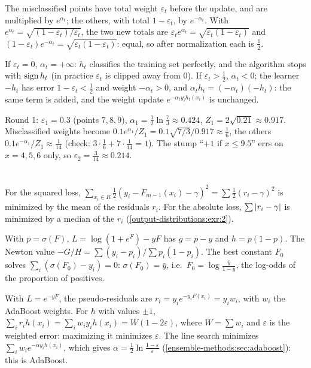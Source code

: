 The misclassified points have total weight $\varepsilon_t$ before the update, and are multiplied by $e^{\alpha_t}$; the
others, with total $1 - \varepsilon_t$, by $e^{-\alpha_t}$. With $e^{\alpha_t} = \sqrt{(1 - \varepsilon_t)/\varepsilon_t}$, the two new totals are
$\varepsilon_te^{\alpha_t} = \sqrt{\varepsilon_t(1 - \varepsilon_t)}$ and $(1 - \varepsilon_t)e^{-\alpha_t} = \sqrt{\varepsilon_t(1 - \varepsilon_t)}$: equal, so after normalization each is $\frac12$.

If $\varepsilon_t = 0$, $\alpha_t = +\infty$: $h_t$ classifies the training set perfectly, and the algorithm stops with
$\operatorname{sign} h_t$ (in practice $\varepsilon_t$ is clipped away from $0$). If $\varepsilon_t>\frac12$, $\alpha_t<0$; the learner $-h_t$ has error $1 - \varepsilon_t<\frac12$
and weight $-\alpha_t>0$, and $\alpha_th_t = (-\alpha_t)(-h_t)$: the same term is added, and the weight update
$e^{-\alpha_ty_ih_t(x_i)}$ is unchanged.

Round 1: $\varepsilon_1 = 0.3$ (points $7, 8, 9$), $\alpha_1 = \frac12\ln\frac73\approx0.424$, $Z_1 = 2\sqrt{0.21}\approx0.917$. Misclassified weights become
$0.1e^{\alpha_1}/Z_1 = 0.1\sqrt{7/3}/0.917\approx\frac16$, the others $0.1e^{-\alpha_1}/Z_1\approx\frac1{14}$ (check: $3\cdot\frac16 + 7\cdot\frac1{14} = 1$). The stump
``$+1$ if $x\leq9.5$'' errs on $x = 4, 5, 6$ only, so $\varepsilon_2 = \frac3{14}\approx0.214$.

\section{}

For the squared loss, $\sum_{x_i\in R}\frac12(y_i - F_{m-1}(x_i) - \gamma)^2 = \sum\frac12(r_i - \gamma)^2$ is minimized by the mean of the
residuals $r_i$. For the absolute loss, $\sum\left|r_i - \gamma\right|$ is minimized by a median of the $r_i$
(\cref{output-distributions:exr:2}).

With $p = \sigma(F)$, $L = \log(1 + e^F) - yF$ has $g = p - y$ and $h = p(1 - p)$. The Newton value
$-G/H = \sum(y_i - p_i)/\sum p_i(1 - p_i)$. The best constant $F_0$ solves $\sum_i(\sigma(F_0) - y_i) = 0$: $\sigma(F_0) = \bar y$, i.e.\
$F_0 = \log\frac{\bar y}{1 - \bar y}$, the log-odds of the proportion of positives.

With $L = e^{-yF}$, the pseudo-residuals are $r_i = y_ie^{-y_iF(x_i)} = y_iw_i$, with $w_i$ the AdaBoost weights. For
$h$ with values $\pm1$, $\sum_ir_ih(x_i) = \sum_iw_iy_ih(x_i) = W(1 - 2\varepsilon)$, where $W = \sum w_i$ and $\varepsilon$ is the weighted
error: maximizing it minimizes $\varepsilon$. The line search minimizes $\sum_iw_ie^{-\alpha y_ih(x_i)}$, which gives
$\alpha = \frac12\ln\frac{1 - \varepsilon}\varepsilon$ (\cref{ensemble-methods:sec:adaboost}): this is AdaBoost.

